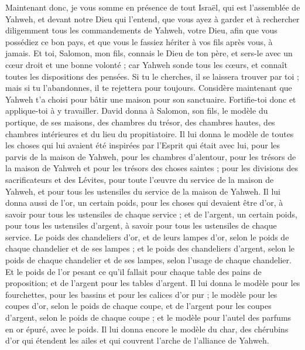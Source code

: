 \begin{multicols}{2}
Maintenant donc, je vous somme en présence de tout Israël, qui est l'assemblée de Yahweh, et devant notre Dieu qui l'entend, que vous ayez à garder et à rechercher diligemment tous les commandements de Yahweh, votre Dieu, afin que vous possédiez ce bon pays, et que vous le fassiez hériter à vos fils après vous, à jamais.
Et toi, Salomon, mon fils, connais le Dieu de ton père, et sers-le avec un cœur droit et une bonne volonté ; car Yahweh sonde tous les cœurs, et connaît toutes les dispositions des pensées. Si tu le cherches, il se laissera trouver par toi ; mais si tu l'abandonnes, il te rejettera pour toujours.
Considère maintenant que Yahweh t'a choisi pour bâtir une maison pour son sanctuaire. Fortifie-toi donc et applique-toi à y travailler.
David donna à Salomon, son fils, le modèle du portique, de ses maisons, des chambres du trésor, des chambres hautes, des chambres intérieures et du lieu du propitiatoire.
Il lui donna le modèle de toutes les choses qui lui avaient été inspirées par l'Esprit qui était avec lui, pour les parvis de la maison de Yahweh, pour les chambres d'alentour, pour les trésors de la maison de Yahweh et pour les trésors des choses saintes ;
pour les divisions des sacrificateurs et des Lévites, pour toute l'œuvre du service de la maison de Yahweh, et pour tous les ustensiles du service de la maison de Yahweh.
Il lui donna aussi de l'or, un certain poids, pour les choses qui devaient être d'or, à savoir pour tous les ustensiles de chaque service ; et de l'argent, un certain poids, pour tous les ustensiles d'argent, à savoir pour tous les ustensiles de chaque service.
Le poids des chandeliers d'or, et de leurs lampes d'or, selon le poids de chaque chandelier et de ses lampes ; et le poids des chandeliers d'argent, selon le poids de chaque chandelier et de ses lampes, selon l’usage de chaque chandelier.
Et le poids de l'or pesant ce qu'il fallait pour chaque table des pains de proposition; et de l'argent pour les tables d'argent.
Il lui donna le modèle pour les fourchettes, pour les bassins et pour les calices d’or pur ; le modèle pour les coupes d'or, selon le poids de chaque coupe,  et de l'argent pour les coupes d'argent, selon le poids de chaque coupe ;
et le modèle pour l'autel des parfums en or épuré, avec le poids. Il lui donna encore le modèle du char, des chérubins d’or qui étendent les ailes et qui couvrent l’arche de l'alliance de Yahweh.

\end{multicols}
